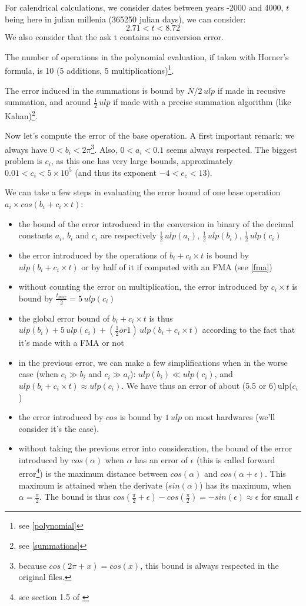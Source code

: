 For calendrical calculations, we consider dates between years -2000 and 4000, $t$ being here in julian millenia (\num{365250} julian days), we can consider: $$2.71 < t < 8.72$$ We also consider that the ask t contains no conversion error.

The number of operations in the polynomial evaluation, if taken with Horner's formula, is 10 (5 additions, 5 multiplications)\footnote{see \ref{polynomial}}. 

The error induced in the summations is bound by $N/2\,ulp$ if made in recusive summation, and around $\frac{1}{2}\,ulp$ if made with a precise summation algorithm (like Kahan)\footnote{see \ref{summations}}.

Now let's compute the error of the base operation. A first important remark: we always have $0<b_i<2\pi$\footnote{because $cos(2\pi+x)=cos(x)$, this bound is always respected in the original files.}. Also, $0<a_i<0.1$ seems always respected. The biggest problem is $c_i$, as this one has very large bounds, approximately $0.01<c_i<5\times10^5$ (and thus its exponent $-4<e_c<13$).

We can take a few steps in evaluating the error bound of one base operation $a_i\times cos(b_i + c_i \times t)$:
\begin{itemize}
\item the bound of the error introduced in the conversion in binary of the decimal constants $a_i$, $b_i$ and $c_i$ are respectively $\frac{1}{2}\,ulp(a_i)$, $\frac{1}{2}\,ulp(b_i)$, $\frac{1}{2}\,ulp(c_i)$
\item the error introduced by the operations of $b_i + c_i \times t$ is bound by $ulp(b_i+c_i\times t)$ or by half of it if computed with an FMA (see \ref{fma})
\item without counting the error on multiplication, the error introduced by $c_i \times t$ is bound by $\frac{t_{max}}{2}=5\,ulp(c_i)$
\item the global error bound of $b_i + c_i \times t$ is thus $ulp(b_i) + 5\,ulp(c_i) + (\frac{1}{2} or 1)\,ulp(b_i+c_i\times t)$ according to the fact that it's made with a FMA or not
\item in the previous error, we can make a few simplifications when in the worse case (when $c_i \gg b_i$ and $c_i \gg a_i$): $ulp(b_i) \ll ulp(c_i)$, and $ulp(b_i+c_i\times t)\approx ulp(c_i)$. We have thus an error of about (5.5 or 6)\,ulp($c_i$)
\item the error introduced by $cos$ is bound by $1\,ulp$ on most hardwares (we'll consider it's the case).
\item without taking the previous error into consideration, the bound of the error introduced by $cos(\alpha)$ when $\alpha$ has an error of $\epsilon$ (this is called forward error\footnote{see section 1.5 of \cite{Higham}}) is the maximum distance between $cos(\alpha)$ and $cos(\alpha + \epsilon)$. This maximum is attained when the derivate ($sin(\alpha)$) has its maximum, when $\alpha = \frac{\pi}{2}$. The bound is thus $cos(\frac{\pi}{2}+\epsilon)-cos(\frac{\pi}{2}) = -sin(\epsilon) \approx \epsilon$ for small $\epsilon$
\end{itemize}

